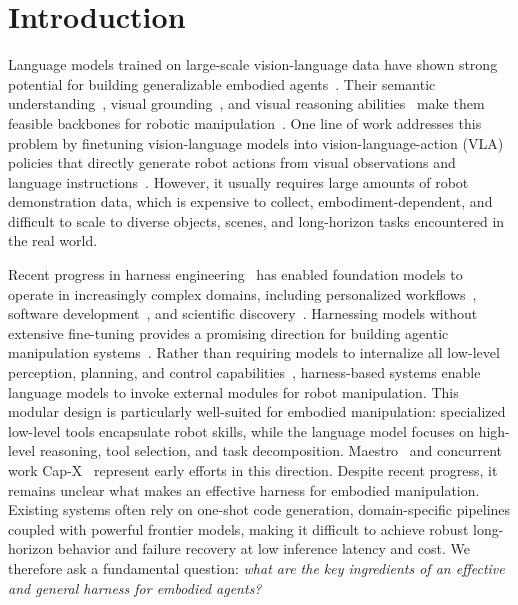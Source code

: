 \section{Introduction}
\label{sec:introduction}

Language models trained on large-scale vision-language data have shown strong potential for building generalizable embodied agents~\citep{driess2023palme,brohan2023rt}. 
Their semantic understanding~\citep{kojima2023largelanguagemodelszeroshot}, visual grounding~\citep{liu2023visualinstructiontuning}, and visual reasoning abilities~\citep{thawakar-etal-2025-llamav, xu2025llavacotletvisionlanguage, lu2024mathvistaevaluatingmathematicalreasoning} make them feasible backbones for robotic manipulation~\citep{fu2026capxframeworkbenchmarkingimproving}. 
One line of work addresses this problem by finetuning vision-language models into vision-language-action (VLA) policies that directly generate robot actions from visual observations and language instructions~\citep{li2024vision,black2025pi,pi0.5,lee2025molmoact,hancock2026actions}. 
However, it usually requires large amounts of robot demonstration data, which is expensive to collect, embodiment-dependent, and difficult to scale to diverse objects, scenes, and long-horizon tasks encountered in the real world.

Recent progress in harness engineering~\citep{openai2026harness} has enabled foundation models to operate in increasingly complex domains, including personalized workflows~\citep{openclaw}, software development~\citep{anthropic_claude_code, openai_codex}, and scientific discovery~\citep{karpathy_autoresearch}. 
Harnessing models without extensive fine-tuning provides a promising direction for building agentic manipulation systems~\citep{shi2025maestro, fu2026capxframeworkbenchmarkingimproving}.
Rather than requiring models to internalize all low-level perception, planning, and control capabilities~\citep{sapkota2026visionlanguageactionvlamodelsconcepts}, harness-based systems enable language models to invoke external modules for robot manipulation. 
This modular design is particularly well-suited for embodied manipulation: specialized low-level tools encapsulate robot skills, while the language model focuses on high-level reasoning, tool selection, and task decomposition.
Maestro~\citep{shi2025maestro} and concurrent work Cap-X~\citep{fu2026capxframeworkbenchmarkingimproving} represent early efforts in this direction.
Despite recent progress, it remains unclear what makes an effective harness for embodied manipulation. Existing systems often rely on one-shot code generation, domain-specific pipelines coupled with powerful frontier models, making it difficult to achieve robust long-horizon behavior and failure recovery at low inference latency and cost. We therefore ask a fundamental question: \emph{what are the key ingredients of an effective and general harness for embodied agents?}

